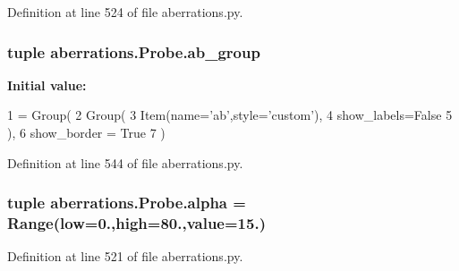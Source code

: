 Definition at line 524 of file aberrations.\-py.

\hypertarget{classaberrations_1_1_probe_a5bb14f69d46f84ec516fd540431c2d91}{
\subsubsection[{ab\-\_\-group}]{\setlength{\rightskip}{0pt plus 5cm}tuple aberrations.\-Probe.\-ab\-\_\-group\hspace{0.3cm}{\ttfamily [static]}}}\label{classaberrations_1_1_probe_a5bb14f69d46f84ec516fd540431c2d91}
{\bfseries Initial value\-:}
\begin{DoxyCode}
1 = Group(
2         Group(
3             Item(name=\textcolor{stringliteral}{'ab'},style=\textcolor{stringliteral}{'custom'}),
4             show\_labels=\textcolor{keyword}{False}
5         ),
6         show\_border = \textcolor{keyword}{True}
7         )
\end{DoxyCode}


Definition at line 544 of file aberrations.\-py.

\hypertarget{classaberrations_1_1_probe_a4c41bbc5180131ebfb0bf219a3580fc8}{
\subsubsection[{alpha}]{\setlength{\rightskip}{0pt plus 5cm}tuple aberrations.\-Probe.\-alpha = Range(low=0.,high=80.,{\bf value}=15.)\hspace{0.3cm}{\ttfamily [static]}}}\label{classaberrations_1_1_probe_a4c41bbc5180131ebfb0bf219a3580fc8}


Definition at line 521 of file aberrations.\-py.

